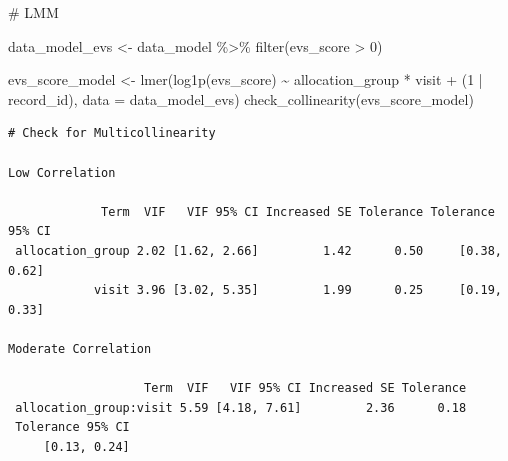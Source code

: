 \documentclass[
  letterpaper,
  DIV=11,
  numbers=noendperiod]{scrartcl}
\newenvironment{Shaded}{\begin{snugshade}}{\end{snugshade}}
\newcommand{\AttributeTok}[1]{\textcolor[rgb]{0.40,0.45,0.13}{#1}}
\newcommand{\CommentTok}[1]{\textcolor[rgb]{0.37,0.37,0.37}{#1}}
\newcommand{\DecValTok}[1]{\textcolor[rgb]{0.68,0.00,0.00}{#1}}
\newcommand{\FunctionTok}[1]{\textcolor[rgb]{0.28,0.35,0.67}{#1}}
\newcommand{\NormalTok}[1]{\textcolor[rgb]{0.00,0.23,0.31}{#1}}
\newcommand{\OtherTok}[1]{\textcolor[rgb]{0.00,0.23,0.31}{#1}}
\newcommand{\SpecialCharTok}[1]{\textcolor[rgb]{0.37,0.37,0.37}{#1}}
\newcommand{\StringTok}[1]{\textcolor[rgb]{0.13,0.47,0.30}{#1}}
\begin{document}
\begin{Shaded}
\begin{Highlighting}[]
\CommentTok{\# LMM}

\NormalTok{data\_model\_evs }\OtherTok{\textless{}{-}}\NormalTok{ data\_model }\SpecialCharTok{\%\textgreater{}\%}
  \FunctionTok{filter}\NormalTok{(evs\_score }\SpecialCharTok{\textgreater{}} \DecValTok{0}\NormalTok{)}

\NormalTok{evs\_score\_model }\OtherTok{\textless{}{-}} \FunctionTok{lmer}\NormalTok{(}\FunctionTok{log1p}\NormalTok{(evs\_score) }\SpecialCharTok{\textasciitilde{}}\NormalTok{ allocation\_group }\SpecialCharTok{*}\NormalTok{ visit }\SpecialCharTok{+}\NormalTok{ (}\DecValTok{1} \SpecialCharTok{|}\NormalTok{ record\_id), }\AttributeTok{data =}\NormalTok{ data\_model\_evs)}
\FunctionTok{check\_collinearity}\NormalTok{(evs\_score\_model)}
\end{Highlighting}
\end{Shaded}

\begin{verbatim}
# Check for Multicollinearity

Low Correlation

             Term  VIF   VIF 95% CI Increased SE Tolerance Tolerance 95% CI
 allocation_group 2.02 [1.62, 2.66]         1.42      0.50     [0.38, 0.62]
            visit 3.96 [3.02, 5.35]         1.99      0.25     [0.19, 0.33]

Moderate Correlation

                   Term  VIF   VIF 95% CI Increased SE Tolerance
 allocation_group:visit 5.59 [4.18, 7.61]         2.36      0.18
 Tolerance 95% CI
     [0.13, 0.24]
\end{verbatim}

\begin{Shaded}
\end{Shaded}
\end{document}

